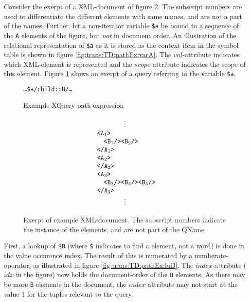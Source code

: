 \begin{myExample}
Consider the exerpt of a XML-document of figure \ref{fig:trans:TD:pathExXml}. The subscript numbers are used to
differentiate the different elements with same names, and are not a part of the names. Further, let a non-iterator
variable \texttt{\$a} be bound to a sequence of the \texttt{A} elements of the figure, but \emph{not} in document order.
An illustration of the relational representation of \texttt{\$a} as it is stored as the context item in the symbol
table is shown in figure \ref{fig:trans:TD:pathEx:varA}. The $val$-attribute indicates which XML-element is
represented and the $scope$-attribute indicates the scope of this element. Figure \ref{fig:trans:TD:pathQu} shows
an exerpt of a query referring to the variable \texttt{\$a}. \begin{figure}[h!]
\centering
\texttt{\ldots\$a/child::B/\ldots}
\caption{Example XQuery path expression \label{fig:trans:TD:pathQu}}
\end{figure} 

\begin{figure}[h]
\centering
\begin{equation*}
\begin{array}{l}
\qquad \qquad \vdots \\
\mbox{\texttt{<A}}_{1}\mbox{\texttt{>}} \\ \quad
\mbox{\texttt{<B}}_{1}\mbox{\texttt{/>}}\mbox{\texttt{<B}}_{2}\mbox{\texttt{/>}} \\
\mbox{\texttt{</A}}_{1}\mbox{\texttt{>}} \\
\mbox{\texttt{<A}}_{2}\mbox{\texttt{>}} \\ 
\mbox{\texttt{</A}}_{2}\mbox{\texttt{>}} \\
\mbox{\texttt{<A}}_{3}\mbox{\texttt{>}} \\ \quad
\mbox{\texttt{<B}}_{3}\mbox{\texttt{/>}}\mbox{\texttt{<B}}_{4}\mbox{\texttt{/>}}\mbox{\texttt{<B}}_{5}\mbox{\texttt{/>}}
\\ \mbox{\texttt{</A}}_{3}\mbox{\texttt{>}} \\
\qquad \qquad \vdots
\end{array}
\end{equation*}
\caption[Exerpt of example XML-document.]{Exerpt of example XML-document. The subscript numbers indicate the
instance of the elements, and are not part of the QName \label{fig:trans:TD:pathExXml}}
\end{figure}

First, a lookup of \texttt{\$B} (where \texttt{\$} indicates to find a element, not a word) is done in the value
occurence index. The result of this is numerated by a \textsf{numberate}-operator, as illustrated in figure
\ref{fig:trans:TD:pathEx:luB}. The $index$-attribute ($idx$ in the figure) now holds the document-order of the
\texttt{B} elements. As there may be more \texttt{B} elements in the document, the $index$ attribute may not start
at the value 1 for the tuples relevant to the query.


\end{myExample}
